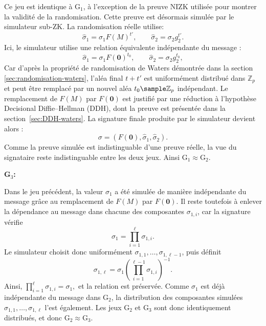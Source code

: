 Ce jeu est identique à G$_1$, à l'exception de la preuve NIZK utilisée
pour montrer la validité de la randomisation. Cette preuve est désormais
simulée par le simulateur sub-ZK. La randomisation réelle utilise:
\[
\widehat{\sigma}_1=\sigma_1F(M)^{t'},
\qquad
\widehat{\sigma}_2=\sigma_2g_2^{t'}.
\]
Ici, le simulateur utilise une relation équivalente indépendante
du message :
\[
\widehat{\sigma}_1=\sigma_1F(\mathbf{0})^{t_0},
\qquad
\widehat{\sigma}_2=\sigma_2g_2^{t_0},
\]
Car d'après la propriété de randomisation de Waters démontrée dans
la section \ref{sec:randomisation-waters}, l'aléa final $t+t'$ est
uniformément distribué dans $\mathbb{Z}_p$ et peut être remplacé par un
nouvel aléa $t_0\sample\mathbb{Z}_p$ indépendant.
Le remplacement de $F(M)$ par $F(\mathbf{0})$ est justifié par une 
réduction à l'hypothèse Decisional Diffie--Hellman (DDH),
dont la preuve est présentée dans la section~\ref{sec:DDH-waters}.
La signature finale produite par le simulateur devient alors :
\[
\sigma=(F(\mathbf{0}),\widehat{\sigma}_1,\widehat{\sigma}_2).
\]
Comme la preuve simulée est indistinguable d'une preuve réelle, 
la vue du signataire reste indistinguable entre les deux jeux.
Ainsi $\mathrm{G}_1\approx\mathrm{G}_2$.


\noindent\textbf{G$_3$:}

Dans le jeu précédent, la valeur $\sigma_1$ a été simulée de manière
indépendante du message grâce au remplacement de $F(M)$ par $F(\mathbf{0})$.
Il reste toutefois à enlever la dépendance au message dans chacune des
composantes $\sigma_{1,i}$, car la signature vérifie
\[
\sigma_1=\prod_{i=1}^{\ell}\sigma_{1,i}.
\]
Le simulateur choisit donc uniformément
$\sigma_{1,1},\ldots,\sigma_{1,\ell-1}$, puis définit 
\[
\sigma_{1,\ell}
=
\sigma_1
\left(
\prod_{i=1}^{\ell-1}\sigma_{1,i}
\right)^{-1}.
\]
Ainsi,
$
\prod_{i=1}^{\ell}\sigma_{1,i}
=
\sigma_1,
$
et la relation est préservée. Comme $\sigma_1$ est déjà indépendante du message dans G$_2$,
la distribution des composantes simulées
$\sigma_{1,1},\ldots,\sigma_{1,\ell}$ l'est également. Les jeux $\mathrm{G}_2$ et $\mathrm{G}_3$ 
sont donc identiquement distribués, et donc
$\mathrm{G}_2 \approx \mathrm{G}_3$.


